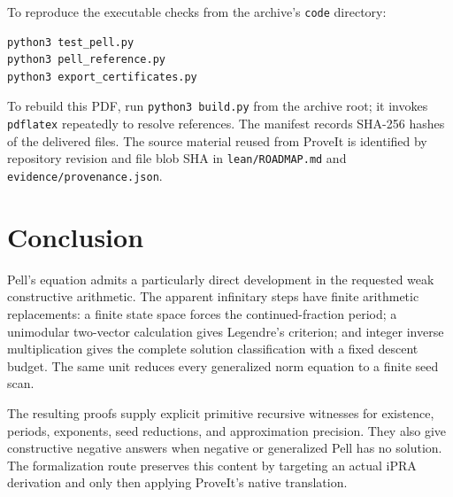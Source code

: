 \documentclass[11pt,letterpaper]{article}
\theoremstyle{definition}
\newcommand{\code}[1]{\texttt{#1}}
\begin{document}
To reproduce the executable checks from the archive's \code{code} directory:
\begin{lstlisting}
python3 test_pell.py
python3 pell_reference.py
python3 export_certificates.py
\end{lstlisting}
To rebuild this PDF, run \code{python3 build.py} from the archive root;
it invokes \code{pdflatex} repeatedly to resolve references. The manifest
records SHA-256 hashes of the delivered files. The source material reused
from ProveIt is identified by repository revision and file blob SHA in
\code{lean/ROADMAP.md} and \code{evidence/provenance.json}.

\section{Conclusion}

Pell's equation admits a particularly direct development in the requested
weak constructive arithmetic. The apparent infinitary steps have finite
arithmetic replacements: a finite state space forces the continued-fraction
period; a unimodular two-vector calculation gives Legendre's criterion;
and integer inverse multiplication gives the complete solution
classification with a fixed descent budget. The same unit reduces every
generalized norm equation to a finite seed scan.

The resulting proofs supply explicit primitive recursive witnesses for
existence, periods, exponents, seed reductions, and approximation precision.
They also give constructive negative answers when negative or generalized
Pell has no solution. The formalization route preserves this content by
targeting an actual iPRA derivation and only then applying ProveIt's native
translation.
\end{document}
